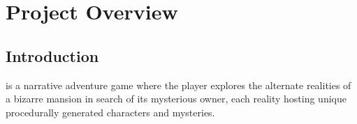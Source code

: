 \chapter{Project Overview}
\section{Introduction}

\ourgame{} is a narrative adventure game where the player explores the alternate realities of a bizarre mansion in search of its mysterious owner, each reality hosting unique procedurally generated characters and mysteries.

%



